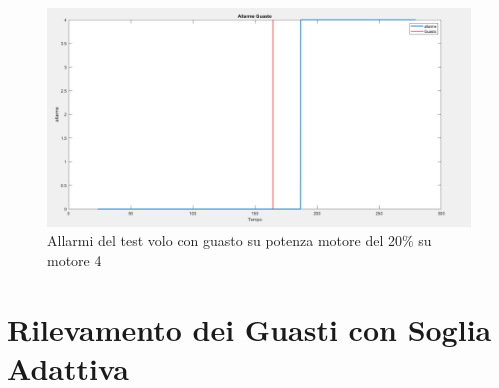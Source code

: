 \begin{figure}[H]
    \centering
    \includegraphics[width=\textwidth]{files/images/path_soglia_fissa4 (1).png}
    \caption{Allarmi del test volo con guasto su potenza motore del 20\% su motore 4}
    \label{Allarmi del test volo con guasto su potenza motore del 20\% su motore 4}
\end{figure}
\noindent

\section{Rilevamento dei Guasti con Soglia Adattiva}

